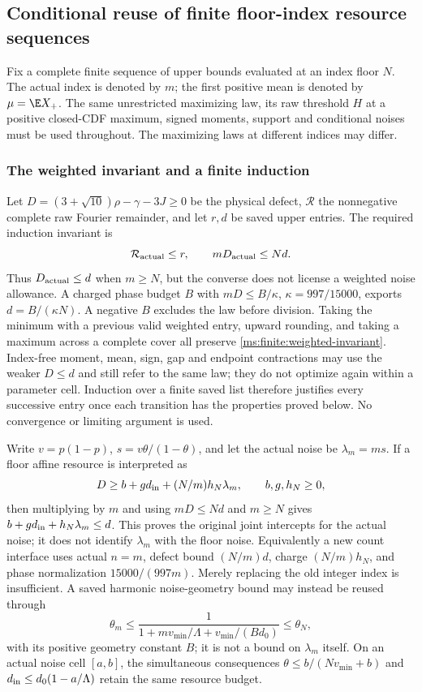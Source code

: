 \subsection{Conditional reuse of finite floor-index resource sequences}
\label{ms:finite:floor-transfer}
Fix a complete finite sequence of upper bounds evaluated at an index
floor $N$. The actual index is denoted by $m$; the first positive mean is denoted by $\mu=\E X_+$. The same
unrestricted maximizing law, its raw threshold $H$ at a positive closed-CDF
maximum, signed moments, support and conditional noises must be used throughout.
The maximizing laws at different indices may differ.

\subsubsection{The weighted invariant and a finite induction}
\label{ms:finite:weighted-induction}
Let $D=(3+\sqrt{10})\rho-\gamma-3J\ge0$ be the physical defect,
$\mathcal R$ the nonnegative complete raw Fourier remainder, and let
$r,d$ be saved upper entries. The required induction invariant is
\begin{equation}\label{ms:finite:weighted-invariant}
 \mathcal R_{\rm actual}\le r,\qquad mD_{\rm actual}\le Nd.
\end{equation}
Thus $D_{\rm actual}\le d$ when $m\ge N$, but the converse does
not license a weighted noise allowance. A charged phase budget $B$ with
$mD\le B/\kappa$, $\kappa=997/15000$, exports
$d=B/(\kappa N)$. A negative $B$ excludes the law before division.
Taking the minimum with a previous valid weighted entry, upward rounding,
and taking a maximum across a complete cover all preserve
\eqref{ms:finite:weighted-invariant}. Index-free moment, mean, sign,
gap and endpoint contractions may use the weaker $D\le d$ and still
refer to the same law; they do not optimize again within a parameter cell.
Induction over a finite saved list therefore justifies every successive
entry once each transition has the properties proved below. No convergence
or limiting argument is used.

Write $v=p(1-p)$, $s=v\theta/(1-\theta)$, and let the actual noise be
$\lambda_m=ms$. If a floor affine resource is interpreted as
\begin{equation}\label{ms:finite:scaled-charge}
 D\ge b+g d_{\rm in}+(N/m)h_N\lambda_m,
 \qquad b,g,h_N\ge0,
\end{equation}
then multiplying by $m$ and using $mD\le Nd$ and $m\ge N$ gives
$b+g d_{\rm in}+h_N\lambda_m\le d$.
This proves the original joint intercepts for the actual noise; it does
not identify $\lambda_m$ with the floor noise. Equivalently a new count
interface uses actual $n=m$, defect bound $(N/m)d$, charge $(N/m)h_N$,
and phase normalization $15000/(997m)$. Merely replacing the old integer
index is insufficient. A saved harmonic noise-geometry bound may instead
be reused through
\[
 \theta_m\le\frac1{1+mv_{\min}/\Lambda+v_{\min}/(B d_0)}
 \le\theta_N,
\]
with its positive geometry constant $B$; it is not a bound on
$\lambda_m$ itself. On an actual noise cell $[a,b]$, the simultaneous
consequences $\theta\le b/(Nv_{\min}+b)$ and
$d_{\rm in}\le d_0(1-a/\Lambda)$ retain the same resource budget.

